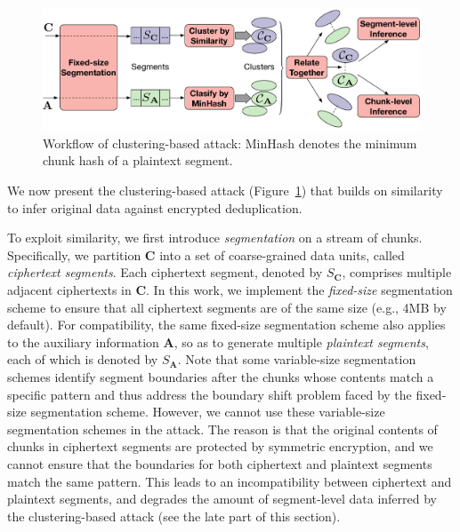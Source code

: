 \documentclass[bachelor]{thesis-uestc}
\begin{document}
\begin{figure}
	\includegraphics[width=.48\textwidth]{pic/clustering-attack-new.pdf}
    \caption{Workflow of clustering-based attack: MinHash denotes the minimum chunk hash of a plaintext segment.}
	\label{fig:clustering-attack}
\end{figure}

We now present the clustering-based attack (Figure~\ref{fig:clustering-attack}) that builds on similarity to infer original data against encrypted deduplication. 


To exploit similarity, we first introduce {\em segmentation} on a stream of chunks. Specifically, we partition $\mathbf{C}$ into a set of coarse-grained data units, called {\em ciphertext segments}. Each ciphertext segment, denoted by $S_\mathbf{C}$, comprises multiple adjacent ciphertexts in $\mathbf{C}$. In this work, we implement the {\em fixed-size} segmentation scheme to ensure that all ciphertext segments are of the same size (e.g., 4MB by default). 
For compatibility, the same fixed-size segmentation scheme also applies to the auxiliary information $\mathbf{A}$, so as to generate multiple {\em plaintext segments}, each of which is denoted by $S_\mathbf{A}$. 
Note that some variable-size segmentation schemes \cite{lillibridge09, qin17}  identify segment boundaries after the chunks whose contents match a specific pattern and thus address the boundary shift problem faced by the fixed-size segmentation scheme. 
However, we cannot use these variable-size segmentation schemes \cite{lillibridge09, qin17} in the attack. The reason is that the original contents of chunks in ciphertext segments are protected by symmetric encryption, and we cannot ensure that the boundaries for both ciphertext and plaintext segments match the same pattern. This leads to an incompatibility between ciphertext and plaintext segments, and degrades the amount of segment-level data inferred by the clustering-based attack (see the late part of this section).    
\end{document}
